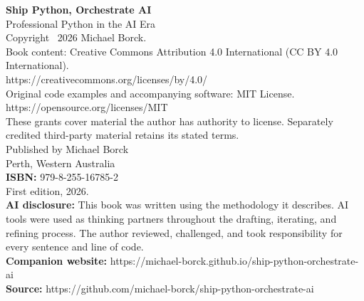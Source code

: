 \thispagestyle{empty}
\vspace*{\fill}

\begin{flushleft}
\textbf{Ship Python, Orchestrate AI}\\
Professional Python in the AI Era\\[1.5em]
Copyright \textcopyright\ 2026 Michael Borck.\\[1em]
Book content: Creative Commons Attribution 4.0 International (CC BY 4.0 International).\\
https://creativecommons.org/licenses/by/4.0/\\[0.5em]
Original code examples and accompanying software: MIT License.\\
https://opensource.org/licenses/MIT\\[0.5em]
These grants cover material the author has authority to license. Separately credited third-party material retains its stated terms.\\[1em]
Published by Michael Borck\\
Perth, Western Australia\\[1em]
\textbf{ISBN:} 979-8-255-16785-2\\[1em]
First edition, 2026.\\[1em]
\textbf{AI disclosure:} This book was written using the methodology it describes. AI tools were used as thinking partners throughout the drafting, iterating, and refining process. The author reviewed, challenged, and took responsibility for every sentence and line of code.\\[1em]
\textbf{Companion website:} https://michael-borck.github.io/ship-python-orchestrate-ai\\
\textbf{Source:} https://github.com/michael-borck/ship-python-orchestrate-ai
\end{flushleft}

\vspace*{\fill}
\clearpage
